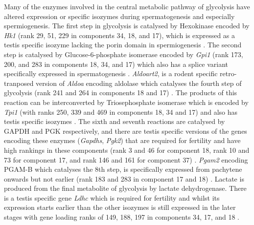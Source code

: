 Many of the enzymes involved in the central metabolic pathway of glycolysis have altered expression or specific isozymes during spermatogenesis and especially spermiogenesis. The first step in glycolysis is catalysed by Hexokinase encoded by \textit{Hk1} (rank 29, 51, 229 in components 34, 18, and 17), which is expressed as a testis specific isozyme lacking the porin domain in spermiogenesis \parencite{Mori1993Unique,Nakamura2008Spermatogenic}. The second step is catalysed by Glucose-6-phosphate isomerase encoded by \textit{Gpi1} (rank 173, 200, and 283 in components 18, 34, and 17) which also has a splice variant specifically expressed in spermatogenesis \parencite{Buehr1981electrophoretically, Vemuganti2010Frequent}. \textit{Aldoart2}, is a rodent specific retro-tranposed version of \textit{Aldoa} encoding aldolase which catalyses the fourth step of glycolysis (rank 241 and 264 in components 18 and 17) \parencite{Vemuganti2007Three, Vemuganti2010Frequent}. The products of this reaction can be interconverted by Triosephosphate isomerase which is encoded by \textit{Tpi1} (with ranks 250, 339 and 469 in components 18, 34 and 17) and also has testis specific isozymes \parencite{Ijiri2013Male}. The sixth and seventh reactions are catalysed by GAPDH and PGK respectively, and there are testis specific versions of the genes encoding these enzymes (\textit{Gapdhs}, \textit{Pgk2}) that are required for fertility and have high rankings in these components (rank 3 and 46 for component 18, rank 10 and 73 for component 17, and rank 146 and 161 for component 37) \parencite{McCarrey1987Human,Welch1992Expression, Miki2004Glyceraldehyde, Danshina2010Phosphoglycerate}. \textit{Pgam2} encoding PGAM-B which catalyses the 8th step, is specifically expressed from pachytene onwards but not earlier (rank 183 and 283 in component 17 and 18) \parencite{Fundele1987Developmental}. Lactate is produced from the final metabolite of glycolysis by lactate dehydrogenase. There is a testis specific gene \textit{Ldhc} which is required for fertility and whilst its expression starts earlier than the other isozymes is still expressed in the later stages with gene loading ranks of 149, 188, 197 in components 34, 17, and 18 \parencite{Sakai1987Molecular, Odet2008Expression}.


